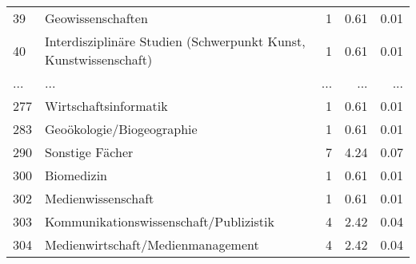 \begin{longtable}{lXrrr}
        39 & \multicolumn{1}{X}{Geowissenschaften} & %
          \num{1} &
          \num[round-mode=places,round-precision=2]{0.61} &
          \num[round-mode=places,round-precision=2]{0.01} \\
        40 & \multicolumn{1}{X}{Interdisziplinäre Studien (Schwerpunkt Kunst, Kunstwissenschaft)} & %
          \num{1} &
          \num[round-mode=places,round-precision=2]{0.61} &
          \num[round-mode=places,round-precision=2]{0.01} \\
       ... & ... & ... & ... & ... \\
        277 & \multicolumn{1}{X}{Wirtschaftsinformatik} & %
          \num{1} &
          \num[round-mode=places,round-precision=2]{0.61} &
          \num[round-mode=places,round-precision=2]{0.01} \\

        283 & \multicolumn{1}{X}{Geoökologie/Biogeographie} & %
          \num{1} &
          \num[round-mode=places,round-precision=2]{0.61} &
          \num[round-mode=places,round-precision=2]{0.01} \\

        290 & \multicolumn{1}{X}{Sonstige Fächer} & %
          \num{7} &
          \num[round-mode=places,round-precision=2]{4.24} &
          \num[round-mode=places,round-precision=2]{0.07} \\

        300 & \multicolumn{1}{X}{Biomedizin} & %
          \num{1} &
          \num[round-mode=places,round-precision=2]{0.61} &
          \num[round-mode=places,round-precision=2]{0.01} \\

        302 & \multicolumn{1}{X}{Medienwissenschaft} & %
          \num{1} &
          \num[round-mode=places,round-precision=2]{0.61} &
          \num[round-mode=places,round-precision=2]{0.01} \\

        303 & \multicolumn{1}{X}{Kommunikationswissenschaft/Publizistik} & %
          \num{4} &
          \num[round-mode=places,round-precision=2]{2.42} &
          \num[round-mode=places,round-precision=2]{0.04} \\

        304 & \multicolumn{1}{X}{Medienwirtschaft/Medienmanagement} & %
          \num{4} &
          \num[round-mode=places,round-precision=2]{2.42} &
          \num[round-mode=places,round-precision=2]{0.04} \\


\end{longtable}
